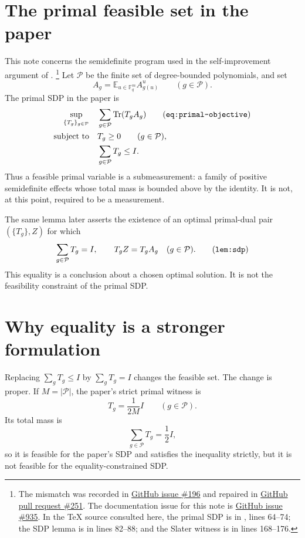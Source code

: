 \documentclass[11pt]{article}
\newcommand{\Tr}{\operatorname{Tr}}
\newcommand{\cP}{\mathcal P}
\begin{document}
\section{The primal feasible set in the paper}

This note concerns the semidefinite program used in the self-improvement
argument of \cite[Subsection~\emph{A semidefinite program}]{Ji2020LowIndividualDegree}.
\footnote{The mismatch was recorded in
\href{https://github.com/LionSR/MIPStarRE/issues/196}{GitHub issue \#196} and
repaired in
\href{https://github.com/LionSR/MIPStarRE/pull/251}{GitHub pull request \#251}.
The documentation issue for this note is
\href{https://github.com/LionSR/MIPStarRE/issues/935}{GitHub issue \#935}. In
the TeX source consulted here, the primal SDP is in
, lines 64--74; the SDP lemma is
in lines 82--88; and the Slater witness is in lines 168--176.}
Let $\cP$ be the finite set of degree-bounded polynomials, and set
\[
  A_g = \mathbb E_{u\in \mathbb F_q^m} A^u_{g(u)}
  \qquad (g\in\cP).
\]
The primal SDP in the paper is
\begin{align}
  \sup_{\{T_g\}_{g\in\cP}}
    &\quad \sum_{g\in\cP} \Tr(T_g A_g) \tag{\texttt{eq:primal-objective}}\\
  \text{subject to}
    &\quad T_g\ge 0 \qquad(g\in\cP), \notag\\
    &\quad \sum_{g\in\cP} T_g\le I. \notag
\end{align}
Thus a feasible primal variable is a submeasurement: a family of positive
semidefinite effects whose total mass is bounded above by the identity. It is
not, at this point, required to be a measurement.

The same lemma later asserts the existence of an optimal primal-dual pair
$(\{T_g\},Z)$ for which
\[
  \sum_{g\in\cP} T_g=I,
  \qquad
  T_g Z=T_g A_g \quad(g\in\cP).
  \tag{\texttt{lem:sdp}}
  \label{lem:sdp}
\]
This equality is a conclusion about a chosen optimal solution. It is not the
feasibility constraint of the primal SDP.

\section{Why equality is a stronger formulation}

Replacing $\sum_g T_g\le I$ by $\sum_g T_g=I$ changes the feasible set. The
change is proper. If $M=|\cP|$, the paper's strict primal witness is
\[
  T_g=\frac{1}{2M}I \qquad(g\in\cP).
\]
Its total mass is
\[
  \sum_{g\in\cP} T_g=\frac12 I,
\]
so it is feasible for the paper's SDP and satisfies the inequality strictly, but
it is not feasible for the equality-constrained SDP.
\end{document}

